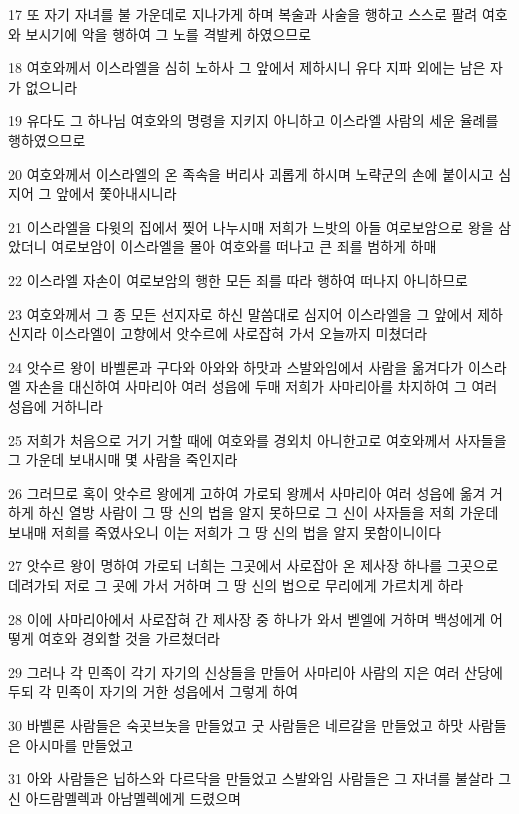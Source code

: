 \par 17 또 자기 자녀를 불 가운데로 지나가게 하며 복술과 사술을 행하고 스스로 팔려 여호와 보시기에 악을 행하여 그 노를 격발케 하였으므로
\par 18 여호와께서 이스라엘을 심히 노하사 그 앞에서 제하시니 유다 지파 외에는 남은 자가 없으니라
\par 19 유다도 그 하나님 여호와의 명령을 지키지 아니하고 이스라엘 사람의 세운 율례를 행하였으므로
\par 20 여호와께서 이스라엘의 온 족속을 버리사 괴롭게 하시며 노략군의 손에 붙이시고 심지어 그 앞에서 쫓아내시니라
\par 21 이스라엘을 다윗의 집에서 찢어 나누시매 저희가 느밧의 아들 여로보암으로 왕을 삼았더니 여로보암이 이스라엘을 몰아 여호와를 떠나고 큰 죄를 범하게 하매
\par 22 이스라엘 자손이 여로보암의 행한 모든 죄를 따라 행하여 떠나지 아니하므로
\par 23 여호와께서 그 종 모든 선지자로 하신 말씀대로 심지어 이스라엘을 그 앞에서 제하신지라 이스라엘이 고향에서 앗수르에 사로잡혀 가서 오늘까지 미쳤더라
\par 24 앗수르 왕이 바벨론과 구다와 아와와 하맛과 스발와임에서 사람을 옮겨다가 이스라엘 자손을 대신하여 사마리아 여러 성읍에 두매 저희가 사마리아를 차지하여 그 여러 성읍에 거하니라
\par 25 저희가 처음으로 거기 거할 때에 여호와를 경외치 아니한고로 여호와께서 사자들을 그 가운데 보내시매 몇 사람을 죽인지라
\par 26 그러므로 혹이 앗수르 왕에게 고하여 가로되 왕께서 사마리아 여러 성읍에 옮겨 거하게 하신 열방 사람이 그 땅 신의 법을 알지 못하므로 그 신이 사자들을 저희 가운데 보내매 저희를 죽였사오니 이는 저희가 그 땅 신의 법을 알지 못함이니이다
\par 27 앗수르 왕이 명하여 가로되 너희는 그곳에서 사로잡아 온 제사장 하나를 그곳으로 데려가되 저로 그 곳에 가서 거하며 그 땅 신의 법으로 무리에게 가르치게 하라
\par 28 이에 사마리아에서 사로잡혀 간 제사장 중 하나가 와서 벧엘에 거하며 백성에게 어떻게 여호와 경외할 것을 가르쳤더라
\par 29 그러나 각 민족이 각기 자기의 신상들을 만들어 사마리아 사람의 지은 여러 산당에 두되 각 민족이 자기의 거한 성읍에서 그렇게 하여
\par 30 바벨론 사람들은 숙곳브놋을 만들었고 굿 사람들은 네르갈을 만들었고 하맛 사람들은 아시마를 만들었고
\par 31 아와 사람들은 닙하스와 다르닥을 만들었고 스발와임 사람들은 그 자녀를 불살라 그 신 아드람멜렉과 아남멜렉에게 드렸으며
